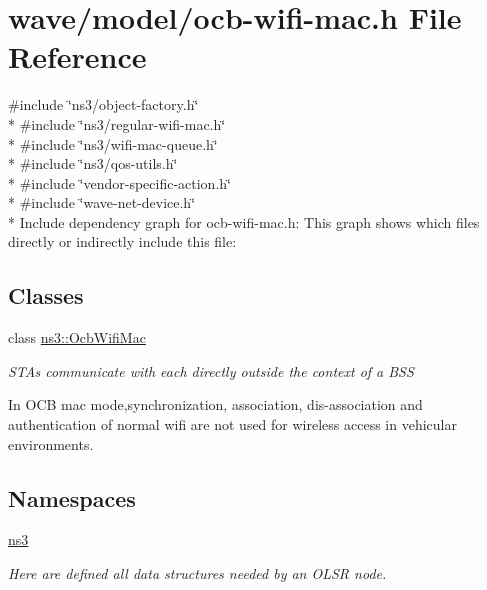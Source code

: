 \hypertarget{ocb-wifi-mac_8h}{}\section{wave/model/ocb-\/wifi-\/mac.h File Reference}
\label{ocb-wifi-mac_8h}
{\ttfamily \#include \char`\"{}ns3/object-\/factory.\+h\char`\"{}}\\*
{\ttfamily \#include \char`\"{}ns3/regular-\/wifi-\/mac.\+h\char`\"{}}\\*
{\ttfamily \#include \char`\"{}ns3/wifi-\/mac-\/queue.\+h\char`\"{}}\\*
{\ttfamily \#include \char`\"{}ns3/qos-\/utils.\+h\char`\"{}}\\*
{\ttfamily \#include \char`\"{}vendor-\/specific-\/action.\+h\char`\"{}}\\*
{\ttfamily \#include \char`\"{}wave-\/net-\/device.\+h\char`\"{}}\\*
Include dependency graph for ocb-\/wifi-\/mac.h\+:
This graph shows which files directly or indirectly include this file\+:
\subsection*{Classes}
\begin{DoxyCompactItemize}
\item 
class \hyperlink{classns3_1_1OcbWifiMac}{ns3\+::\+Ocb\+Wifi\+Mac}
\begin{DoxyCompactList}\small\item\em S\+T\+As communicate with each directly outside the context of a B\+SS

In O\+CB mac mode,synchronization, association, dis-\/association and authentication of normal wifi are not used for wireless access in vehicular environments. \end{DoxyCompactList}\end{DoxyCompactItemize}
\subsection*{Namespaces}
\begin{DoxyCompactItemize}
\item 
 \hyperlink{namespacens3}{ns3}
\begin{DoxyCompactList}\small\item\em Here are defined all data structures needed by an O\+L\+SR node. \end{DoxyCompactList}\end{DoxyCompactItemize}
